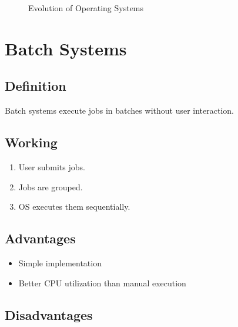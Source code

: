 \begin{figure}[H]
\centering
{}
\caption{Evolution of Operating Systems}
\end{figure}

\section{Batch Systems}

\subsection{Definition}

Batch systems execute jobs in batches without user interaction.

\subsection{Working}

\begin{enumerate}
\item User submits jobs.
\item Jobs are grouped.
\item OS executes them sequentially.
\end{enumerate}

\subsection{Advantages}

\begin{itemize}
\item Simple implementation
\item Better CPU utilization than manual execution
\end{itemize}

\subsection{Disadvantages}

